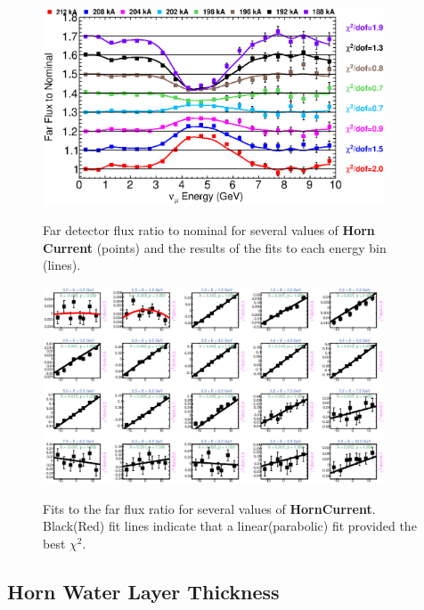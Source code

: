 \begin{figure}[ht]
  \begin{center}
    {\includegraphics[width=4.0in]{figures/HornCurrent_far_summary.eps}}
  \end{center}
\caption{ Far detector flux ratio to nominal for several values of {\bf Horn Current} (points) and the results of the fits to each energy bin (lines).}
\end{figure}

\begin{figure}[hb]
  \begin{center}
    {\includegraphics[width=4.0in]{figures/HornCurrent_far_fits.eps}}
  \end{center}
\caption{ Fits to the far flux ratio for several values of {\bf HornCurrent}. Black(Red) fit lines indicate that a linear(parabolic) fit provided the best $\chi^2$. }
\end{figure}

\clearpage
\subsection{Horn Water Layer Thickness}

